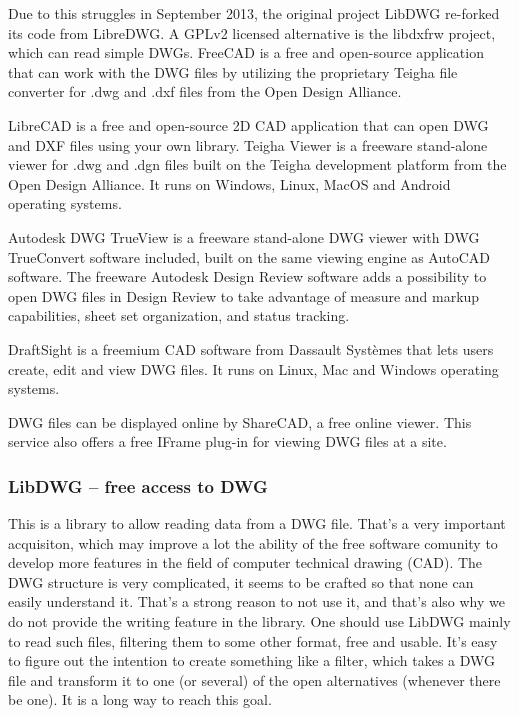 \documentclass[a4paper, 11pt, article]{report}
\begin{document}
Due to this struggles in September 2013, the original project LibDWG re-forked its code from LibreDWG. A GPLv2 licensed alternative is the libdxfrw project, which can read simple DWGs. 
FreeCAD is a free and open-source application that can work with the DWG files by utilizing the proprietary Teigha file converter for .dwg and .dxf files from the Open Design Alliance. 

LibreCAD is a free and open-source 2D CAD application that can open DWG and DXF files using your own library.
Teigha Viewer is a freeware stand-alone viewer for .dwg and .dgn files built on the Teigha development platform from the Open Design Alliance. It runs on Windows, Linux, MacOS and Android operating systems.

Autodesk DWG TrueView is a freeware stand-alone DWG viewer with DWG TrueConvert software included, built on the same viewing engine as AutoCAD software. The freeware Autodesk Design Review software adds a possibility to open DWG files in Design Review to take advantage of measure and markup capabilities, sheet set organization, and status tracking.

DraftSight is a freemium CAD software from Dassault Systèmes that lets users create, edit and view DWG files. It runs on Linux, Mac and Windows operating systems. 

DWG files can be displayed online by ShareCAD, a free online viewer. This service also offers a free IFrame plug-in for viewing DWG files at a site.

\subsubsection{LibDWG – free access to DWG}

This is a library to allow reading data from a DWG file. That's a very important acquisiton, which may improve a lot the ability of the free software comunity to develop more features in the field of computer technical drawing (CAD).
The DWG structure is very complicated, it seems to be crafted so that none can easily understand it. That's a strong reason to not use it, and that's also why we do not provide the writing feature in the library. One should use LibDWG mainly to read such files, filtering them to some other format, free and usable.
It's easy to figure out the intention to create something like a filter, which takes a DWG file and transform it to one (or several) of the open alternatives (whenever there be one). It is a long way to reach this goal.
  
\end{document}
